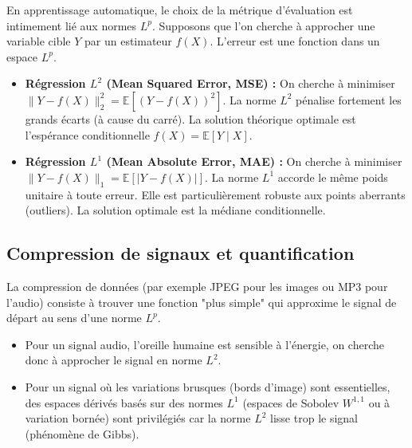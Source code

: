 \documentclass[11pt,a4paper]{article}
\begin{document}
En apprentissage automatique, le choix de la métrique d'évaluation est intimement lié aux normes $L^p$. Supposons que l'on cherche à approcher une variable cible $Y$ par un estimateur $f(X)$. L'erreur est une fonction dans un espace $L^p$.
\begin{itemize}\item \textbf{Régression $L^2$ (Mean Squared Error, MSE) :} On cherche à minimiser $\|Y - f(X)\|_2^2 = \mathbb{E}[(Y - f(X))^2]$. La norme $L^2$ pénalise fortement les grands écarts (à cause du carré). La solution théorique optimale est l'espérance conditionnelle $f(X) = \mathbb{E}[Y \mid X]$.
\item \textbf{Régression $L^1$ (Mean Absolute Error, MAE) :} On cherche à minimiser $\|Y - f(X)\|_1 = \mathbb{E}[|Y - f(X)|]$. La norme $L^1$ accorde le même poids unitaire à toute erreur. Elle est particulièrement robuste aux points aberrants (outliers). La solution optimale est la médiane conditionnelle.\end{itemize}

\subsection{Compression de signaux et quantification}

La compression de données (par exemple JPEG pour les images ou MP3 pour l'audio) consiste à trouver une fonction "plus simple" qui approxime le signal de départ au sens d'une norme $L^p$.
\begin{itemize}\item Pour un signal audio, l'oreille humaine est sensible à l'énergie, on cherche donc à approcher le signal en norme $L^2$.
\item Pour un signal où les variations brusques (bords d'image) sont essentielles, des espaces dérivés basés sur des normes $L^1$ (espaces de Sobolev $W^{1,1}$ ou à variation bornée) sont privilégiés car la norme $L^2$ lisse trop le signal (phénomène de Gibbs).\end{itemize}


\begin{center}
\end{center}
\end{document}
